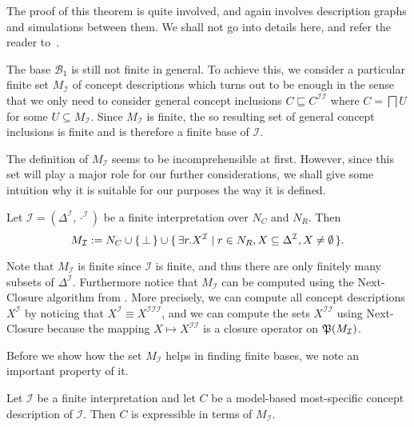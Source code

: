 The proof of this theorem is quite involved, and again involves \EL description graphs and
simulations between them.  We shall not go into details here, and refer the reader
to~\cite[Section 5.1.1]{Diss-Felix}.

The base $\mathcal{B}_1$ is still not finite in general.  To achieve this, we consider a
particular finite set $M_{\mathcal{I}}$ of concept descriptions which turns out to be
enough in the sense that we only need to consider general concept inclusions $C
\sqsubseteq C^{\mathcal{I}\mathcal{I}}$ where $C = \bigsqcap U$ for some $U \subseteq
M_{\mathcal{I}}$.  Since $M_{\mathcal{I}}$ is finite, the so resulting set of general
concept inclusions is finite and is therefore a finite base of $\mathcal{I}$.

The definition of $M_{\mathcal{I}}$ seems to be incomprehensible at first.  However, since
this set will play a major role for our further considerations, we shall give some
intuition why it is suitable for our purposes the way it is defined.

\begin{Definition}[$M_{\mathcal{I}}$]
  \label{def:M_I}
  Let $\mathcal{I} = (\Delta^{\mathcal{I}}, \cdot^{\mathcal{I}})$ be a finite
  interpretation over $N_C$ and $N_R$.  Then
  \begin{equation*}
    M_{\mathcal{I}} := N_C \cup {\ensuremath{\{\, \bot \,\}}} \cup {\ensuremath{\{\, \exists r. X^{\mathcal{I}} \mid
      r \in N_R, X \subseteq \Delta^{\mathcal{I}}, X \neq \emptyset \,\}}}.
  \end{equation*}
\end{Definition}

Note that $M_{\mathcal{I}}$ is finite since $\mathcal{I}$ is finite, and thus there are
only finitely many subsets of $\Delta^{\mathcal{I}}$.  Furthermore notice that
$M_{\mathcal{I}}$ can be computed using the Next-Closure algorithm from
.  More precisely, we can compute all concept descriptions
$X^{\mathcal{I}}$ by noticing that $X^{\mathcal{I}} \equiv
X^{\mathcal{I}\mathcal{I}\mathcal{I}}$, and we can compute the sets
$X^{\mathcal{I}\mathcal{I}}$ using Next-Closure because the mapping $X \mapsto
X^{\mathcal{I}\mathcal{I}}$ is a closure operator on ${\mathfrak{P}(M_{\mathcal{I}})}$.

Before we show how the set $M_{\mathcal{I}}$ helps in finding finite bases, we note an
important property of it.

\begin{Lemma}
  \label{lem:mmsc-are-expressible-in-terms-of-M_I}
  Let $\mathcal{I}$ be a finite interpretation and let $C$ be a model-based most-specific
  concept description of $\mathcal{I}$.  Then $C$ is expressible in terms of
  $M_{\mathcal{I}}$.
\end{Lemma}

